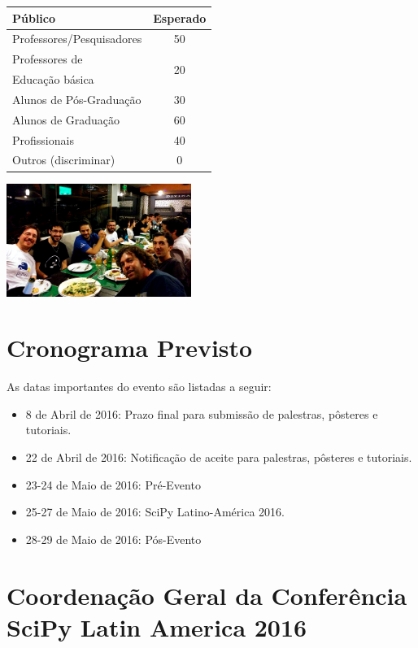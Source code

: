 \documentclass[a4paper,twocolumn,openright,article]{memoir}
\begin{document}
\begin{center}
\begin{tabular}{l c}
\bfseries{Público} & \bfseries{Esperado} \\\toprule
Professores/Pesquisadores & 50\\
Professores de & \multirow{2}{*}{20}\\
Educação básica & \\
Alunos de Pós-Graduação & 30\\
Alunos de Graduação & 60\\
Profissionais & 40\\
Outros (discriminar) & 0\\\bottomrule
\end{tabular}
\end{center}

\ifprint
\else
	\begin{center}
		\includegraphics[width=6cm]{imagens/CFlOZY5WYAETG6-small.jpg}
	\end{center}
\fi

\chapter*{Cronograma Previsto}

As datas importantes do evento são listadas a seguir:
\begin{itemize}
\item 8 de Abril de 2016: Prazo final para submissão de palestras, pôsteres e
tutoriais.
\item 22 de Abril de 2016: Notificação de aceite para palestras, pôsteres e
tutoriais.
\item 23-24 de Maio de 2016: Pré-Evento
\item 25-27 de Maio de 2016: SciPy Latino-América 2016.
\item 28-29 de Maio de 2016: Pós-Evento
\end{itemize}

\eject
\onecolumn
\chapter*{Coordenação Geral da Conferência \\SciPy Latin America 2016}
\end{document}
